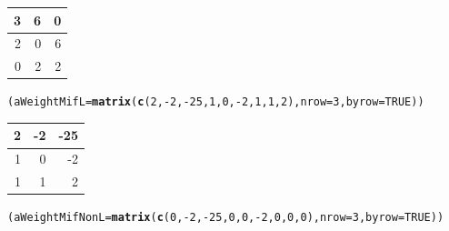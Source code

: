 \documentclass[a4paper,10pt]{article}\usepackage[]{graphicx}\usepackage[]{color}
\makeatletter
\newcommand{\hlnum}[1]{\textcolor[rgb]{0.686,0.059,0.569}{#1}}%
\newcommand{\hlopt}[1]{\textcolor[rgb]{0,0,0}{#1}}%
\newcommand{\hlstd}[1]{\textcolor[rgb]{0.345,0.345,0.345}{#1}}%
\newcommand{\hlkwb}[1]{\textcolor[rgb]{0.69,0.353,0.396}{#1}}%
\newcommand{\hlkwc}[1]{\textcolor[rgb]{0.333,0.667,0.333}{#1}}%
\newcommand{\hlkwd}[1]{\textcolor[rgb]{0.737,0.353,0.396}{\textbf{#1}}}%
\newenvironment{kframe}{%
 \def\at@end@of@kframe{}%
 \ifinner\ifhmode%
  \def\at@end@of@kframe{\end{minipage}}%
  \begin{minipage}{\columnwidth}%
 \fi\fi%
 \def\FrameCommand##1{\hskip\@totalleftmargin \hskip-\fboxsep
 \colorbox{shadecolor}{##1}\hskip-\fboxsep
     \hskip-\linewidth \hskip-\@totalleftmargin \hskip\columnwidth}%
 \MakeFramed {\advance\hsize-\width
   \@totalleftmargin\z@ \linewidth\hsize
   \@setminipage}}%
 {\par\unskip\endMakeFramed%
 \at@end@of@kframe}
\newenvironment{knitrout}{}{} %
\makeatother
\begin{document}
\begin{knitrout}
\begin{tabular}{r|r|r}
\hline
3 & 6 & 0\\
\hline
2 & 0 & 6\\
\hline
0 & 2 & 2\\
\hline
\end{tabular}\begin{kframe}\begin{alltt}
\hlstd{(aWeightMifL}\hlkwb{=}\hlkwd{matrix} \hlstd{(}\hlkwd{c}\hlstd{(}\hlnum{2}\hlstd{,}\hlopt{-}\hlnum{2}\hlstd{,}\hlopt{-}\hlnum{25}\hlstd{,}\hlnum{1}\hlstd{,}\hlnum{0}\hlstd{,}\hlopt{-}\hlnum{2}\hlstd{,}\hlnum{1}\hlstd{,}\hlnum{1}\hlstd{,}\hlnum{2}\hlstd{),} \hlkwc{nrow}\hlstd{=}\hlnum{3}\hlstd{,} \hlkwc{byrow}\hlstd{=}\hlnum{TRUE}\hlstd{))}
\end{alltt}
\end{kframe}


\begin{tabular}{r|r|r}
\hline
2 & -2 & -25\\
\hline
1 & 0 & -2\\
\hline
1 & 1 & 2\\
\hline
\end{tabular}\begin{kframe}\begin{alltt}
\hlstd{(aWeightMifNonL}\hlkwb{=}\hlkwd{matrix} \hlstd{(}\hlkwd{c}\hlstd{(}\hlnum{0}\hlstd{,}\hlopt{-}\hlnum{2}\hlstd{,}\hlopt{-}\hlnum{25}\hlstd{,}\hlnum{0}\hlstd{,}\hlnum{0}\hlstd{,}\hlopt{-}\hlnum{2}\hlstd{,}\hlnum{0}\hlstd{,}\hlnum{0}\hlstd{,}\hlnum{0}\hlstd{),} \hlkwc{nrow}\hlstd{=}\hlnum{3}\hlstd{,} \hlkwc{byrow}\hlstd{=}\hlnum{TRUE}\hlstd{))}
\end{alltt}
\end{kframe}



\end{knitrout}
\end{document}
